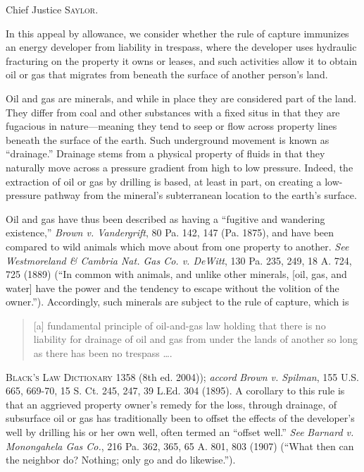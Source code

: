 

\opinion Chief Justice \textsc{Saylor}.

In this appeal by allowance, we consider whether the rule of capture immunizes
an energy developer from liability in trespass, where the developer uses
hydraulic fracturing on the property it owns or leases, and such activities
allow it to obtain oil or gas that migrates from beneath the surface of another
person's land.


Oil and gas are minerals, and while in place they are considered part of the
land. They differ from coal and other substances with a fixed situs in that they
are fugacious in nature---meaning they tend to seep or flow across property
lines beneath the surface of the earth. Such underground movement is known as
``drainage.'' Drainage stems from a physical property of fluids in that they
naturally move across a pressure gradient from high to low pressure. Indeed, the
extraction of oil or gas by drilling is based, at least in part, on creating a
low-pressure pathway from the mineral's subterranean location to the earth's
surface.

Oil and gas have thus been described as having a ``fugitive and wandering
existence,'' \textit{Brown v. Vandergrift}, 80 Pa. 142, 147 (Pa. 1875), and have
been compared to wild animals which move about from one property to another.
\textit{See} \textit{Westmoreland \& Cambria Nat. Gas Co. v. DeWitt}, 130 Pa.
235, 249, 18 A. 724, 725 (1889) (``In common with animals, and unlike other
minerals, [oil, gas, and water] have the power and the tendency to escape
without the volition of the owner.''). Accordingly, such minerals are subject to
the rule of capture, which is
\begin{quote}
[a] fundamental principle of oil-and-gas law holding that there is no liability
for drainage of oil and gas from under the lands of another so long as there has
been no trespass \ldots.
\end{quote}
\textsc{Black's Law Dictionary} 1358 (8th ed. 2004)); \textit{accord}
\textit{Brown v. Spilman}, 155 U.S. 665, 669-70, 15 S. Ct. 245, 247, 39 L.Ed.
304 (1895). A corollary to this rule is that an
aggrieved property owner's remedy for the loss, through drainage, of subsurface
oil or gas has traditionally been to offset the effects of the developer's well
by drilling his or her own well, often termed an ``offset well.'' \textit{See}
\textit{Barnard v. Monongahela Gas Co.}, 216 Pa. 362, 365, 65 A. 801, 803 (1907)
(``What then can the neighbor do? Nothing; only go and do likewise.'').

